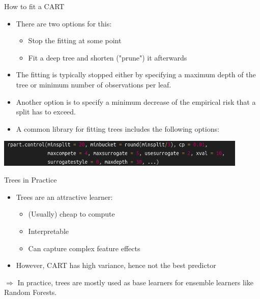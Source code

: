 \documentclass[11pt,compress,t,notes=noshow, xcolor=table]{beamer}
\begin{document}
\begin{vbframe}{How to fit a CART}
\begin{itemize}
\item There are two options for this:
\begin{itemize}
\item Stop the fitting at some point
\item Fit a deep tree and shorten ("prune") it afterwards
\end{itemize}
\item The fitting is typically stopped either by specifying a maximum depth of the tree or minimum number of observations per leaf.
\item Another option is to specify a minimum decrease of the empirical risk that a split has to exceed.
\item A common library for fitting trees includes the following options:
\end{itemize}

{\centering \includegraphics[width=0.9\textwidth]{figure_man/rpart.control-options.png} 

}

\end{vbframe} 

\begin{vbframe}{Trees in Practice}

\begin{itemize}
\item Trees are an attractive learner:
\begin{itemize}
\item (Usually) cheap to compute
\item Interpretable
\item Can capture complex feature effects
\end{itemize}
\item However, CART has high variance, hence not the best predictor
\end{itemize}
$\Rightarrow$ In practice, trees are mostly used as base learners for ensemble learners like Random Forests.
\end{vbframe}
\end{document}
